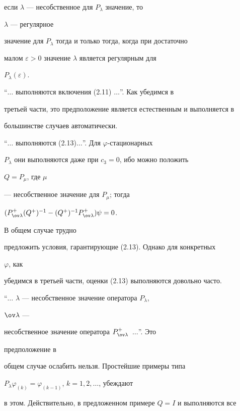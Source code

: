  


{\it 


\noindent если $\lambda$ --- несобственное для $P_\lambda$ значение, то 


$\lambda$ --- регулярное 


значение для $P_\lambda$ тогда и только тогда, когда при достаточно 


малом $\varepsilon>0$ значение $\lambda$ является регулярным для 


$P_\lambda(\varepsilon)$. 


} 


\medskip 


 


``$\dotsc$ выполняются включения (2.11) $\dotsc$''. Как убедимся в 


третьей части, это предположение является естественным и выполняется в 


большинстве случаев автоматически. 


 


``$\dotsc$ выполняются (2.13)$ \dotsc$''. Для $\varphi$-стационарных 


$P_\lambda$ они выполняются даже при $c_3=0$, ибо можно положить 


$Q=P_\mu$, где $\mu$ 


--- несобственное значение для $P_\mu$; тогда 


$(P^+_{\ov\lambda}(Q^+)^{-1}-(Q^+)^{-1}P^+_{\ov\lambda})\psi=0$. 


В общем случае трудно 


предложить условия, гарантирующие (2.13). Однако для конкретных 


$\varphi$, как 


убедимся в третьей части, оценки (2.13) выполняются довольно часто. 


 


``$\dotsc$ $\lambda$ --- несобственное значение оператора $P_\lambda$, 


$\ov\lambda$ --- 


несобственное значение оператора $P^+_{\ov\lambda}$~$\dotsc$''. Это 


предположение в 


общем случае ослабить нельзя. Простейшие примеры типа 


$P_\lambda\varphi_{(k)}=\varphi_{(k-1)}$, $k=1,2,\dotsc$, убеждают 


в этом. Действительно, в предложенном примере $Q=I$ и выполняются все 


